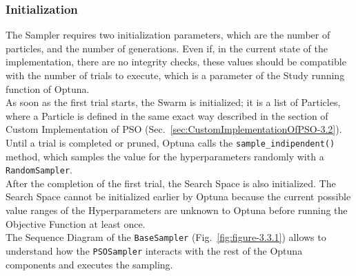 \subsubsection{Initialization}
The Sampler requires two initialization parameters, which are the number of particles, and the number of generations. 
Even if, in the current state of the implementation, there are no integrity checks, these values should be compatible with the number of trials to execute, which is a parameter of the Study running function of Optuna. 
\\[0.3cm]As soon as the first trial starts, the Swarm is initialized; it is a list of Particles, where a Particle is defined in the same exact way described in the section of Custom Implementation of PSO (Sec.~\ref{sec:CustomImplementationOfPSO-3.2}).
\\[0.3cm]Until a trial is completed or pruned, Optuna calls the \texttt{sample\_indipendent()} method, which samples the value for the hyperparameters randomly with a \texttt{RandomSampler}.
\\[0.3cm]After the completion of the first trial, the Search Space is also initialized. The Search Space cannot be initialized earlier by Optuna because the current possible value ranges of the Hyperparameters are unknown to Optuna before running the Objective Function at least once.
\\[0.3cm]The Sequence Diagram of the \texttt{BaseSampler} (Fig.~\ref{fig:figure-3.3.1}) allows to understand how the \texttt{PSOSampler} interacts with the rest of the Optuna components and executes the sampling.
